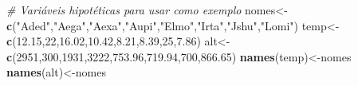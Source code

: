 \documentclass[
]{book}
\newenvironment{Shaded}{\begin{snugshade}}{\end{snugshade}}
\newcommand{\CommentTok}[1]{\textcolor[rgb]{0.56,0.35,0.01}{\textit{#1}}}
\newcommand{\DecValTok}[1]{\textcolor[rgb]{0.00,0.00,0.81}{#1}}
\newcommand{\FloatTok}[1]{\textcolor[rgb]{0.00,0.00,0.81}{#1}}
\newcommand{\FunctionTok}[1]{\textcolor[rgb]{0.13,0.29,0.53}{\textbf{#1}}}
\newcommand{\NormalTok}[1]{#1}
\newcommand{\OtherTok}[1]{\textcolor[rgb]{0.56,0.35,0.01}{#1}}
\newcommand{\StringTok}[1]{\textcolor[rgb]{0.31,0.60,0.02}{#1}}
\begin{document}
\begin{Shaded}
\begin{Highlighting}[]
\CommentTok{\# Variáveis hipotéticas para usar como exemplo}
\NormalTok{nomes}\OtherTok{\textless{}{-}}\FunctionTok{c}\NormalTok{(}\StringTok{"Aded"}\NormalTok{,}\StringTok{"Aega"}\NormalTok{,}\StringTok{"Aexa"}\NormalTok{,}\StringTok{"Aupi"}\NormalTok{,}\StringTok{"Elmo"}\NormalTok{,}\StringTok{"Irta"}\NormalTok{,}\StringTok{"Jshu"}\NormalTok{,}\StringTok{"Lomi"}\NormalTok{)}
\NormalTok{temp}\OtherTok{\textless{}{-}}\FunctionTok{c}\NormalTok{(}\FloatTok{12.15}\NormalTok{,}\DecValTok{22}\NormalTok{,}\FloatTok{16.02}\NormalTok{,}\FloatTok{10.42}\NormalTok{,}\FloatTok{8.21}\NormalTok{,}\FloatTok{8.39}\NormalTok{,}\DecValTok{25}\NormalTok{,}\FloatTok{7.86}\NormalTok{)}
\NormalTok{alt}\OtherTok{\textless{}{-}}\FunctionTok{c}\NormalTok{(}\DecValTok{2951}\NormalTok{,}\DecValTok{300}\NormalTok{,}\DecValTok{1931}\NormalTok{,}\DecValTok{3222}\NormalTok{,}\FloatTok{753.96}\NormalTok{,}\FloatTok{719.94}\NormalTok{,}\DecValTok{700}\NormalTok{,}\FloatTok{866.65}\NormalTok{)}
\FunctionTok{names}\NormalTok{(temp)}\OtherTok{\textless{}{-}}\NormalTok{nomes}
\FunctionTok{names}\NormalTok{(alt)}\OtherTok{\textless{}{-}}\NormalTok{nomes}


\end{Highlighting}
\end{Shaded}
\end{document}
